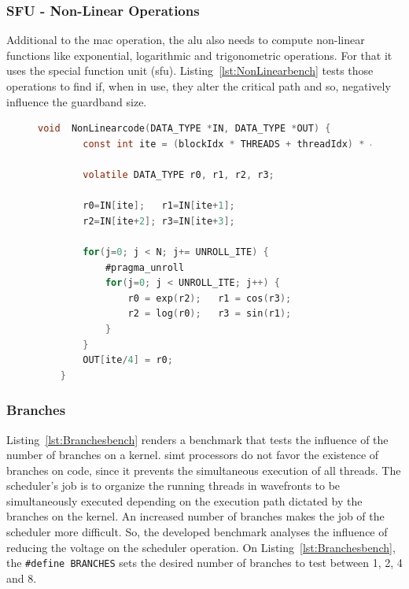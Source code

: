 \subsubsection{SFU - Non-Linear Operations}
    
Additional to the \acrshort{mac} operation, the \acrshort{alu} also needs to compute non-linear functions like exponential, logarithmic and trigonometric operations. For that it uses the special function unit (\acrshort{sfu}). Listing~\ref{lst:NonLinearbench} tests those operations to find if, when in use, they alter the critical path and so, negatively influence the guardband size.
    
\begin{figure}[htpb]
    \begin{lstlisting}[language=C, caption=Non-linear Operations Benchmark Code, label=lst:NonLinearbench, basicstyle=\footnotesize\ttfamily, abovecaptionskip=0pt, captionpos=b]
    void  NonLinearcode(DATA_TYPE *IN, DATA_TYPE *OUT) {
        const int ite = (blockIdx * THREADS + threadIdx) * 4;
        
        volatile DATA_TYPE r0, r1, r2, r3;
        
        r0=IN[ite];   r1=IN[ite+1];  
        r2=IN[ite+2]; r3=IN[ite+3];  
        
        for(j=0; j < N; j+= UNROLL_ITE) {
            #pragma_unroll
            for(j=0; j < UNROLL_ITE; j++) {
                r0 = exp(r2);   r1 = cos(r3);
                r2 = log(r0);   r3 = sin(r1);
            }
        }
        OUT[ite/4] = r0;
    }
    \end{lstlisting}
\end{figure}

\subsubsection{Branches}

Listing~\ref{lst:Branchesbench} renders a benchmark that tests the influence of the number of branches on a kernel. \acrshort{simt} processors do not favor the existence of branches on code, since it prevents the simultaneous execution of all threads. 
The scheduler's job is to organize the running threads in wavefronts to be simultaneously executed depending on the execution path dictated by the branches on the kernel. An increased number of branches makes the job of the scheduler more difficult. So, the developed benchmark analyses the influence of reducing the voltage on the scheduler operation. On Listing~\ref{lst:Branchesbench}, the \texttt{\#define BRANCHES} sets the desired number of branches to test between 1, 2, 4 and 8.

